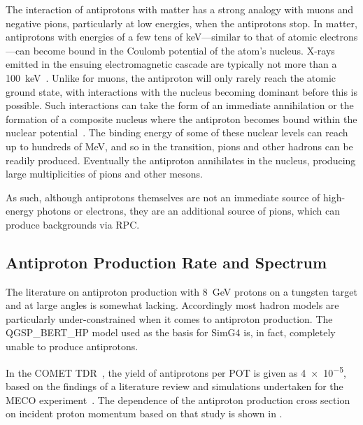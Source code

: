 %
The interaction of antiprotons with matter has a strong analogy with muons and negative pions, particularly at low energies, when the antiprotons stop.
In matter, antiprotons with energies of a few tens of keV---similar to that of atomic electrons---can become bound in the Coulomb potential of the atom's nucleus.
X-rays emitted in the ensuing electromagnetic cascade are typically not more than a 100~keV~\cite{Aramaki201352}.
Unlike for muons, the antiproton will only rarely reach the atomic ground state, with interactions with the nucleus becoming dominant before this is possible.
Such interactions can take the form of an immediate annihilation or the formation of a composite nucleus where the antiproton becomes bound within the nuclear potential~\cite{Wong:1984fy,Mishustin:2004xa}.
The binding energy of some of these nuclear levels can reach up to hundreds of MeV, and so in the transition, pions and other hadrons can be readily produced.
Eventually the antiproton annihilates in the nucleus, producing large multiplicities of pions and other mesons.

As such, although antiprotons themselves are not an immediate source of high-energy photons or electrons, they are an additional source of pions, which can produce backgrounds via \acf{RPC}.

\subsection{Antiproton Production Rate and Spectrum}
The literature on antiproton production with 8~GeV protons on a tungsten target and at large angles is somewhat lacking.
Accordingly most hadron models are particularly under-constrained when it comes to antiproton production.
The QGSP_BERT_HP model used as the basis for SimG4 is, in fact, completely unable to produce antiprotons.

\FigAntiprotonMeco
In the COMET TDR~\cite{TDR2016}, the yield of antiprotons per \ac{POT} is given as \num{4e-5}, based on the findings of a literature review and simulations undertaken for the MECO experiment~\cite{Meco024}.
The dependence of the antiproton production cross section on incident proton momentum based on that study is shown in .

